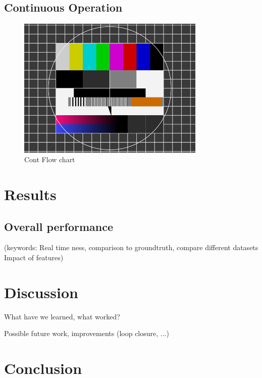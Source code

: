 \documentclass[a4paper,10pt]{article} %
\begin{document}
\subsection{Continuous Operation}
\begin{figure}[ht]
	\includegraphics[width=0.8\textwidth]{test}
	\caption{Cont Flow chart}
	\label{img_flow_cont}
\end{figure}


\newpage
\section{Results}

\subsection{Overall performance}
(keywords: Real time ness, comparison to groundtruth, compare different datasets
Impact of features)

\section{Discussion}
What have we learned, what worked?

Possible future work, improvements (loop closure, ...)

\section{Conclusion}


\newpage
%
\end{document}
